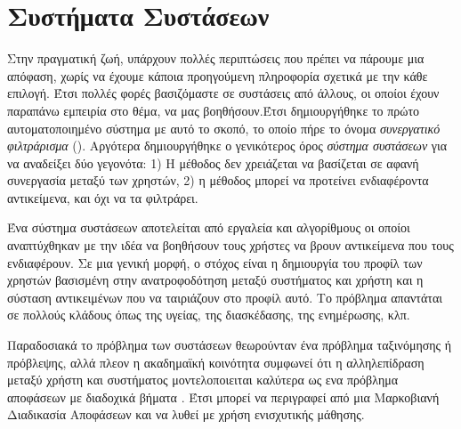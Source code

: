 \section{Συστήματα Συστάσεων}

Στην πραγματική ζωή, υπάρχουν πολλές περιπτώσεις που πρέπει να πάρουμε μια απόφαση, χωρίς να έχουμε κάποια προηγούμενη πληροφορία σχετικά με την κάθε επιλογή. Έτσι πολλές φορές βασιζόμαστε σε συστάσεις από άλλους, οι οποίοι έχουν παραπάνω εμπειρία στο θέμα, να μας βοηθήσουν.Έτσι δημιουργήθηκε το πρώτο αυτοματοποιημένο σύστημα με αυτό το σκοπό, το οποίο πήρε το όνομα \textit{συνεργατικό φιλτράρισμα} (). Αργότερα δημιουργήθηκε ο γενικότερος όρος \textit{σύστημα συστάσεων} για να αναδείξει δύο γεγονότα: 1) Η μέθοδος δεν χρειάζεται να βασίζεται σε αφανή συνεργασία μεταξύ των χρηστών, 2) η μέθοδος μπορεί να προτείνει ενδιαφέροντα αντικείμενα, και όχι να τα φιλτράρει.

Ένα σύστημα συστάσεων αποτελείται από εργαλεία και αλγορίθμους οι οποίοι αναπτύχθηκαν με την ιδέα να βοηθήσουν τους χρήστες να βρουν αντικείμενα που τους ενδιαφέρουν. Σε μια γενική μορφή, ο στόχος είναι η δημιουργία του προφίλ των χρηστών βασισμένη στην ανατροφοδότηση μεταξύ συστήματος και χρήστη και η σύσταση αντικειμένων που να ταιριάζουν στο προφίλ αυτό. Το πρόβλημα απαντάται σε πολλούς κλάδους όπως της υγείας, της διασκέδασης, της ενημέρωσης, κλπ.

Παραδοσιακά το πρόβλημα των συστάσεων θεωρούνταν ένα πρόβλημα ταξινόμησης ή πρόβλεψης, αλλά πλεον η ακαδημαϊκή κοινότητα συμφωνεί ότι η αλληλεπίδραση μεταξύ χρήστη και συστήματος μοντελοποιειται καλύτερα ως ενα πρόβλημα αποφάσεων με διαδοχικά βήματα \cite{rl_recommenders_2021}. Έτσι μπορεί να περιγραφεί από μια Μαρκοβιανή Διαδικασία Αποφάσεων και να λυθεί με χρήση ενισχυτικής μάθησης.

